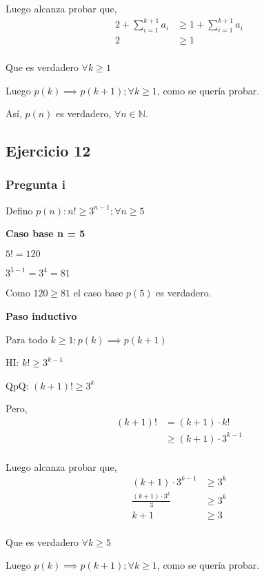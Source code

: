 Luego alcanza probar que,
\begin{align*}
    2+\sum_{i=1}^{k+1}a_i &\geq 1+\sum_{i=1}^{k+1}a_i \\
    2 &\geq 1 \\
\end{align*}

Que es verdadero $\forall k \geq 1$

Luego $p(k) \implies p(k+1); \forall k \geq 1$, como se quería probar.

Así, $p(n)$ es verdadero, $\forall n \in \mathbb{N}$.

\subsection{Ejercicio 12}

\subsubsection{Pregunta i}

Defino $ p(n): n! \geq 3^{n-1}; \forall n \geq 5 $

\textbf{Caso base n = 5}

$ 5! = 120 $

$ 3^{5-1} = 3^4 = 81$

Como $ 120 \geq 81 $ el caso base $p(5)$ es verdadero.

\textbf{Paso inductivo}

Para todo $k \geq 1: p(k) \implies p(k+1)$

HI: $k! \geq 3^{k-1}$

QpQ: $ (k+1)! \geq 3^{k}$

Pero,
\begin{align*}
    (k+1)! &= (k+1) \cdot k! \\
    &\geq (k+1) \cdot 3^{k-1} \\
\end{align*}

Luego alcanza probar que,
\begin{align*}
    (k+1) \cdot 3^{k-1} &\geq 3^{k} \\
    \frac{(k+1)\cdot 3^k}{3} &\geq 3^{k} \\
    k+1 &\geq 3 \\
\end{align*}

Que es verdadero $\forall k \geq 5$

Luego $p(k) \implies p(k+1); \forall k \geq 1$, como se quería probar.

